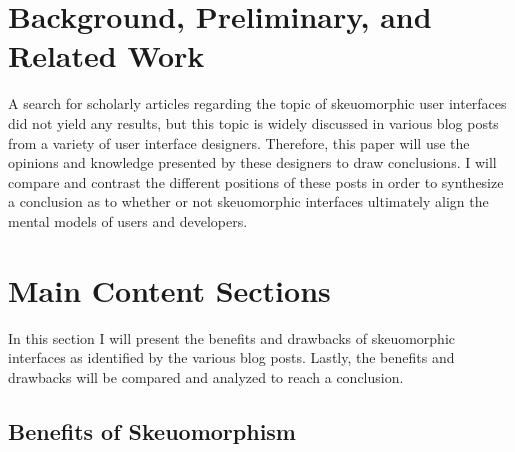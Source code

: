 \documentclass{article}
\begin{document}
\section{Background, Preliminary, and Related Work}

A search for scholarly articles regarding the topic of skeuomorphic user interfaces did not yield any results, but this topic is widely discussed in various blog posts from a variety of user interface designers. Therefore, this paper will use the opinions and knowledge presented by these designers to draw conclusions. I will compare and contrast the different positions of these posts in order to synthesize a conclusion as to whether or not skeuomorphic interfaces ultimately align the mental models of users and developers.

\section{Main Content Sections}
In this section I will present the benefits and drawbacks of skeuomorphic interfaces as identified by the various blog posts. Lastly, the benefits and drawbacks will be compared and analyzed to reach a conclusion. 

\subsection{Benefits of Skeuomorphism}
\end{document}
